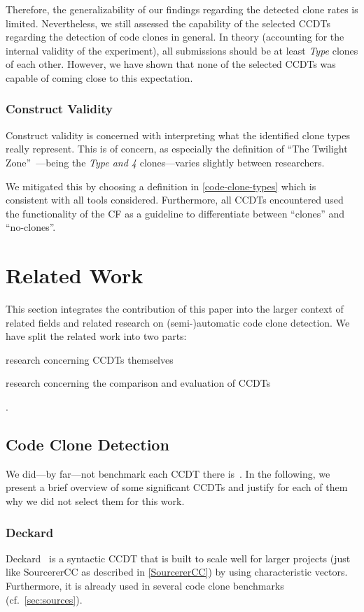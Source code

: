 \documentclass[10pt,journal,compsoc]{IEEEtran}
\def\T#1{\textsl{Type\nobreakdash-#1}}
\begin{document}
Therefore, the generalizability of our findings regarding the detected clone rates is limited. Nevertheless, we still assessed the capability of the selected CCDTs regarding the detection of code clones in general. In theory (accounting for the internal validity of the experiment),
all submissions should be at least \T4 clones of each other. However, we have shown that none of the selected CCDTs was capable of coming close to this expectation.

\subsubsection{Construct Validity}
Construct validity is concerned with interpreting what the identified clone types really represent. This is of concern, as especially the definition of \enquote{The Twilight Zone}~\cite{saini2018oreo}---being the \T{3 and 4} clones---varies slightly between researchers.

We mitigated this by choosing a definition in \cref{code-clone-types} which is consistent with all tools considered. Furthermore, all CCDTs encountered used the functionality of the CF as a guideline to differentiate between \enquote{clones} and \enquote{no-clones}.

\section{Related Work}\label{sec:related-work}
This section integrates the contribution of this paper into the larger context of related fields and related research on \mbox{(semi-)}automatic code clone detection.
We have split the related work into two parts: \begin{inlist}
  \item research concerning CCDTs themselves
  \item research concerning the comparison and evaluation of CCDTs
\end{inlist}.

\subsection{Code Clone Detection}
We did---by far---not benchmark each CCDT there is~\cite{ain2019systematic}.
In the following, we present a brief overview of some significant CCDTs and justify for each of them why we did not select them for this work.

\subsubsection{Deckard}
Deckard~\cite{Deckard} is a syntactic CCDT that is built to scale well for larger projects (just like SourcererCC as described in \cref{SourcererCC}) by using characteristic vectors.
Furthermore, it is already used in several code clone benchmarks~\cite{wagner2014detection,10.1145/3381307.3381310} (cf.~\cref{sec:sources}).
\end{document}
